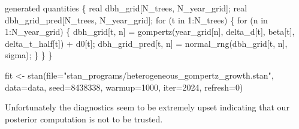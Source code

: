\documentclass[
  letterpaper,
  DIV=11,
  numbers=noendperiod]{scrartcl}
\newenvironment{Shaded}{\begin{snugshade}}{\end{snugshade}}
\newcommand{\AttributeTok}[1]{\textcolor[rgb]{0.40,0.45,0.13}{#1}}
\newcommand{\ControlFlowTok}[1]{\textcolor[rgb]{0.00,0.23,0.31}{#1}}
\newcommand{\DataTypeTok}[1]{\textcolor[rgb]{0.68,0.00,0.00}{#1}}
\newcommand{\DecValTok}[1]{\textcolor[rgb]{0.68,0.00,0.00}{#1}}
\newcommand{\FunctionTok}[1]{\textcolor[rgb]{0.28,0.35,0.67}{#1}}
\newcommand{\KeywordTok}[1]{\textcolor[rgb]{0.00,0.23,0.31}{#1}}
\newcommand{\NormalTok}[1]{\textcolor[rgb]{0.00,0.23,0.31}{#1}}
\newcommand{\OtherTok}[1]{\textcolor[rgb]{0.00,0.23,0.31}{#1}}
\newcommand{\SpecialCharTok}[1]{\textcolor[rgb]{0.37,0.37,0.37}{#1}}
\newcommand{\StringTok}[1]{\textcolor[rgb]{0.13,0.47,0.30}{#1}}
\begin{document}
\begin{codelisting}
\begin{Shaded}
\begin{Highlighting}[]
\KeywordTok{generated quantities}\NormalTok{ \{}
  \DataTypeTok{real}\NormalTok{ dbh\_grid[N\_trees, N\_year\_grid];}
  \DataTypeTok{real}\NormalTok{ dbh\_grid\_pred[N\_trees, N\_year\_grid];}
  \ControlFlowTok{for}\NormalTok{ (t }\ControlFlowTok{in} \DecValTok{1}\NormalTok{:N\_trees) \{}
    \ControlFlowTok{for}\NormalTok{ (n }\ControlFlowTok{in} \DecValTok{1}\NormalTok{:N\_year\_grid) \{}
\NormalTok{      dbh\_grid[t, n] = gompertz(year\_grid[n], delta\_d[t], }
\NormalTok{                       beta[t], delta\_t\_half[t]) + d0[t];}
\NormalTok{      dbh\_grid\_pred[t, n] = normal\_rng(dbh\_grid[t, n], sigma);}
\NormalTok{    \}}
\NormalTok{  \}}
\NormalTok{\}}
\end{Highlighting}
\end{Shaded}

\end{codelisting}

\begin{Shaded}
\begin{Highlighting}[]
\NormalTok{fit }\OtherTok{\textless{}{-}} \FunctionTok{stan}\NormalTok{(}\AttributeTok{file=}\StringTok{"stan\_programs/heterogeneous\_gompertz\_growth.stan"}\NormalTok{,}
            \AttributeTok{data=}\NormalTok{data, }\AttributeTok{seed=}\DecValTok{8438338}\NormalTok{,}
            \AttributeTok{warmup=}\DecValTok{1000}\NormalTok{, }\AttributeTok{iter=}\DecValTok{2024}\NormalTok{, }\AttributeTok{refresh=}\DecValTok{0}\NormalTok{)}
\end{Highlighting}
\end{Shaded}

Unfortunately the diagnostics seem to be extremely upset indicating that
our posterior computation is not to be trusted.

\begin{Shaded}
\end{Shaded}
\end{document}
